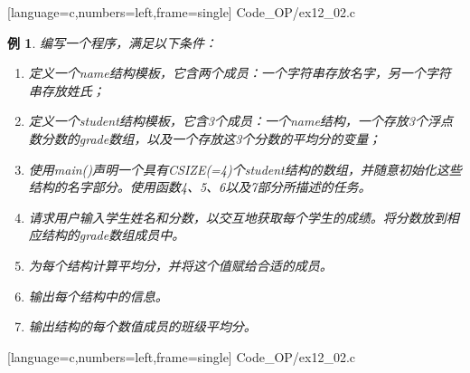 \documentclass[10pt,notheorems]{beamer}
\newtheorem{li}{例}
\begin{document}
\begin{frame}

[language=c,numbers=left,frame=single]
{Code_OP/ex12_02.c}
\end{frame}

\begin{frame}[fragile]
\begin{li}
	编写一个程序，满足以下条件：
	\begin{enumerate}
		\item 定义一个name结构模板，它含两个成员：一个字符串存放名字，另一个字符串存放姓氏；
		\item 定义一个student结构模板，它含3个成员：一个name结构，一个存放3个浮点数分数的grade数组，以及一个存放这3个分数的平均分的变量；
		\item 使用main()声明一个具有CSIZE(=4)个student结构的数组，并随意初始化这些结构的名字部分。使用函数4、5、6以及7部分所描述的任务。
		\item 
		请求用户输入学生姓名和分数，以交互地获取每个学生的成绩。将分数放到相应结构的grade数组成员中。
		\item 为每个结构计算平均分，并将这个值赋给合适的成员。
		\item 输出每个结构中的信息。
		\item 输出结构的每个数值成员的班级平均分。
	\end{enumerate}
\end{li}
\end{frame}


\begin{frame}

[language=c,numbers=left,frame=single]
{Code_OP/ex12_02.c}
\end{frame}
\end{document}
